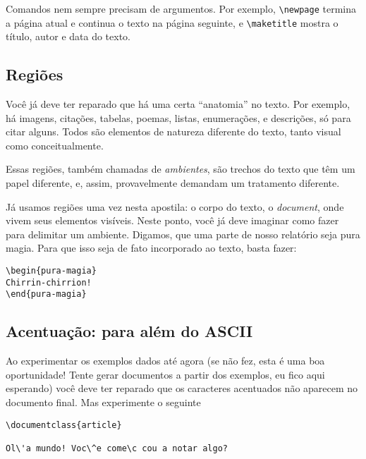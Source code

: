 Comandos nem sempre precisam de argumentos. Por exemplo,
\verb!\newpage! termina a página atual e continua o texto na página
seguinte, e \verb!\maketitle! mostra o título, autor e data do texto.

\subsection{Regiões}

Você já deve ter reparado que há uma certa ``anatomia'' no
texto. Por exemplo, há imagens, citações, tabelas, poemas, listas,
enumerações, e descrições, só para citar alguns. Todos são 
elementos de natureza diferente do texto, tanto visual como
conceitualmente.

Essas regiões, também chamadas de \emph{ambientes}, são trechos do
texto que têm um papel diferente, e, assim, provavelmente demandam um
tratamento diferente.

Já usamos regiões uma vez nesta apostila: o corpo do texto, o
\emph{document}, onde vivem seus elementos visíveis. Neste ponto, você
já deve imaginar como fazer para delimitar um ambiente. Digamos, que
uma parte de nosso relatório seja pura magia. Para que isso seja de
fato incorporado ao texto, basta fazer:

\begin{footnotesize}
\begin{verbatim}
\begin{pura-magia}
Chirrin-chirrion!
\end{pura-magia}
\end{verbatim}
\end{footnotesize}


\subsection{Acentuação: para além do ASCII}\label{subsec:ascii}

Ao experimentar os exemplos dados até agora (se não fez, esta é uma
boa oportunidade! Tente gerar documentos a partir dos exemplos, eu
fico aqui esperando) você deve ter reparado que os caracteres
acentuados não aparecem no documento final. Mas experimente o seguinte
\begin{footnotesize}
\begin{verbatim}
\documentclass{article}

Ol\'a mundo! Voc\^e come\c cou a notar algo?

\end{verbatim}
\end{footnotesize}

